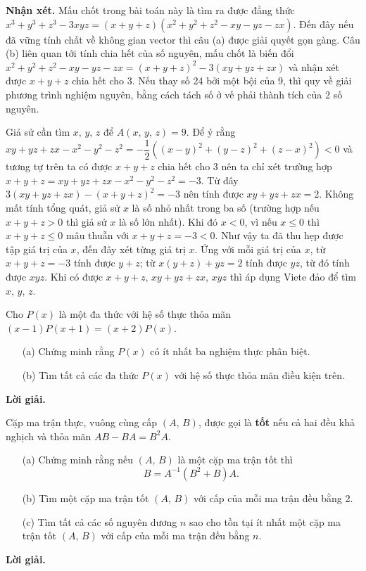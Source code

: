 \textbf{Nhận xét. }Mấu chốt trong bài toán này là tìm ra được đẳng thức $x^3 + y^3 + z^3 - 3xyz = (x+y+z)(x^2+y^2+z^2-xy-yz-zx)$. Đến đây nếu đã vững tính chất về không gian vector thì câu (a) được giải quyết gọn gàng. Câu (b) liên quan tới tính chia hết của số nguyên, mấu chốt là biến đổi $x^2+y^2+z^2-xy-yz-zx = (x+y+z)^2 - 3(xy+yz+zx)$ và nhận xét được $x+y+z$ chia hết cho 3. Nếu thay số 24 bởi một bội của 9, thì quy về giải phương trình nghiệm nguyên, bằng cách tách số ở vế phải thành tích của 2 số nguyên. 

Giả sử cần tìm $x,\,y,\,z$ để $A(x,\,y,\,z) = 9$. Để ý rằng $xy+yz+zx-x^2-y^2-z^2 = -\dfrac{1}{2}\left((x-y)^2 + (y-z)^2 + (z-x)^2\right) < 0$ và tương tự trên ta có được $x+y+z$ chia hết cho 3 nên ta chỉ xét trường hợp $x+y+z = xy+yz+zx-x^2-y^2-z^2 = -3$. Từ đây $3(xy+yz+zx)-(x+y+z)^2 = -3$ nên tính được $xy+yz+zx = 2$. Không mất tính tổng quát, giả sử $x$ là số nhỏ nhất trong ba số (trường hợp nếu $x+y+z > 0$ thì giả sử $x$ là số lớn nhất). Khi đó $x < 0$, vì nếu $x \leq 0$ thì $x + y + z \leq 0$ mâu thuẫn với $x + y + z = -3 < 0$. Như vậy ta đã thu hẹp được tập giá trị của $x$, đến đây xét từng giá trị $x$. Ứng với mỗi giá trị của $x$, từ $x + y + z = -3$ tính được $y + z$; từ $x(y+z) + yz=2$ tính được $yz$, từ đó tính được $xyz$. Khi có được $x+y+z,\,xy+yz+zx,\,xyz$ thì áp dụng Viete đảo để tìm $x,\,y,\,z$.

\begin{tcolorbox}[title=\textbf{Bài toán A.3.},breakable]
    Cho $P(x)$ là một đa thức với hệ số thực thỏa mãn $(x-1)P(x+1) = (x+2)P(x)$.
    \begin{enumerate}
        \item[(a)] {Chứng minh rằng $P(x)$ có ít nhất ba nghiệm thực phân biệt.}
        \item[(b)] {Tìm tất cả các đa thức $P(x)$ với hệ số thực thỏa mãn điều kiện trên.}
    \end{enumerate}
\end{tcolorbox}

\textbf{Lời giải. }

\begin{tcolorbox}[title=\textbf{Bài toán A.5.},breakable]
    Cặp ma trận thực, vuông cùng cấp $(A,\,B)$, được gọi là \textbf{tốt} nếu cả hai đều khả nghịch và thỏa mãn $AB-BA = B^2A$.
    \begin{enumerate}
        \item[(a)] {Chứng minh rằng nếu $(A,\,B)$ là một cặp ma trận tốt thì $$B = A^{-1}(B^2+B)A.$$}
        \item[(b)] {Tìm một cặp ma trận tốt $(A,\,B)$ với cấp của mỗi ma trận đều bằng 2.}
        \item[(c)] {Tìm tất cả các số nguyên dương $n$ sao cho tồn tại ít nhất một cặp ma trận tốt $(A,\,B)$ với cấp của mỗi ma trận đều bằng $n$.} 
    \end{enumerate}
\end{tcolorbox}

\textbf{Lời giải. }